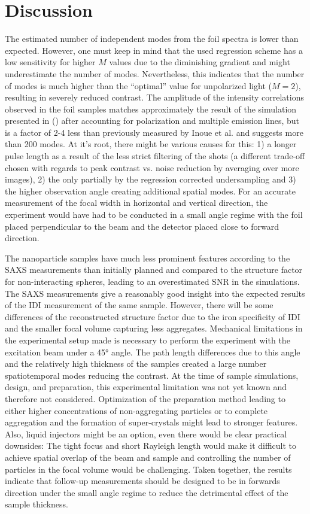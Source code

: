 \section{Discussion}

The estimated number of independent modes from the foil spectra is lower than expected. However, one must keep in mind that the used regression scheme has a low sensitivity for higher $M$ values due to the diminishing gradient and might underestimate the number of modes. Nevertheless, this indicates that the number of modes is much higher than the \enquote{optimal} value for unpolarized light ($M=2$), resulting in severely reduced contrast. The amplitude of the intensity correlations observed in the foil samples matches approximately the result of the simulation presented in   () after accounting for polarization and multiple emission lines, but is a factor of 2-4 less than previously measured by Inoue et al. and suggests more than 200 modes. At it's root, there might be various causes for this: 1) a longer pulse length as a result of the less strict filtering of the shots (a different trade-off chosen with regards to peak contrast vs. noise reduction by averaging over more images), 2) the only partially by the regression corrected undersampling and 3) the higher observation angle creating additional spatial modes. For an accurate measurement of the focal width in horizontal and vertical direction, the experiment would have had to be conducted in a small angle regime with the foil placed perpendicular to the beam and the detector placed close to forward direction.

The nanoparticle samples have much less prominent features according to the SAXS measurements than initially planned and compared to the structure factor for non-interacting spheres, leading to an overestimated SNR in the simulations. The SAXS measurements give a reasonably good insight into the expected results of the IDI measurement of the same sample. However, there will be some differences  of the reconstructed structure factor due to the iron specificity of IDI and the smaller focal volume capturing less aggregates. Mechanical limitations in the experimental setup made is necessary to perform the experiment with the excitation beam under a 45° angle. The path length differences due to this angle and the relatively high thickness of the samples created a large number spatiotemporal modes reducing the contrast. At the time of sample simulations, design, and preparation, this experimental limitation was not yet known and therefore not considered.
Optimization of the preparation method leading to either higher concentrations of non-aggregating particles or to complete aggregation and the formation of super-crystals might lead to stronger features. Also, liquid injectors might be an option, even there would be clear practical downsides: The tight focus and short Rayleigh length would make it difficult to achieve spatial overlap of the beam and sample and controlling the number of particles in the focal volume would be challenging. Taken together, the results indicate that follow-up measurements should be designed to be in forwards direction under the small angle regime to reduce the detrimental effect of the sample thickness.

